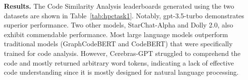 

\textbf{Results.}
The Code Similarity Analysis leaderboards generated using the two datasets are shown in Table~\ref{tab:hpctask1}.
Notably, gpt-3.5-turbo demonstrates superior performance.
Two other models, StarChat-Alpha and Dolly 2.0, also exhibit commendable performance. 
Most large language models outperform traditional models (GraphCodeBERT and CodeBERT) that were specifically trained for code analysis. 
However, Cerebras-GPT struggled to comprehend the code and mostly returned arbitrary word tokens, indicating a lack of effective code understanding since it is mostly designed for natural language processing.

